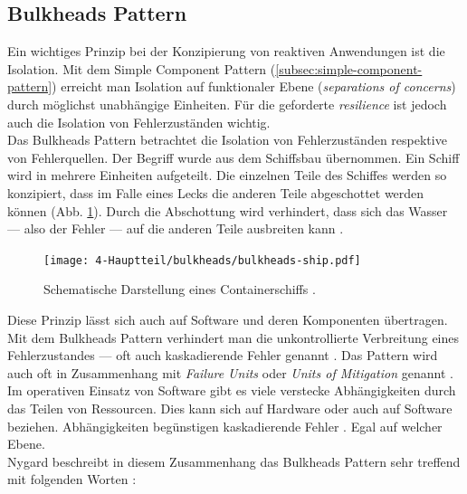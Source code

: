 \subsection{Bulkheads Pattern}
Ein wichtiges Prinzip bei der Konzipierung von reaktiven Anwendungen ist die Isolation. Mit dem Simple Component Pattern (\ref{subsec:simple-component-pattern}) erreicht man Isolation auf funktionaler Ebene (\textit{separations of concerns}) durch möglichst unabhängige Einheiten. Für die geforderte \textit{resilience} ist jedoch auch die Isolation von Fehlerzuständen wichtig.\\
Das Bulkheads Pattern betrachtet die Isolation von Fehlerzuständen respektive von Fehlerquellen. Der Begriff wurde aus dem Schiffsbau übernommen. Ein Schiff wird in mehrere Einheiten aufgeteilt. Die einzelnen Teile des Schiffes werden so konzipiert, dass im Falle eines Lecks die anderen Teile abgeschottet werden können (Abb. \ref{fig:bulkheads-ship}). Durch die Abschottung wird verhindert, dass sich das Wasser --- also der Fehler --- auf die anderen Teile ausbreiten kann \cite[S.~95]{nygard_release_2007} \cite[S.~214]{newman_building_2015} \cite[S.~35]{kuhn_reactive_2015}.\\

\begin{figure}[H]
 \centering
 \texttt{[image: 4-Hauptteil/bulkheads/bulkheads-ship.pdf]}
 \caption{Schematische Darstellung eines Containerschiffs \cite[S.~35]{kuhn_reactive_2015}.}
 \label{fig:bulkheads-ship}
\end{figure}

Diese Prinzip lässt sich auch auf Software und deren Komponenten übertragen. Mit dem Bulkheads Pattern verhindert man die unkontrollierte Verbreitung eines Fehlerzustandes --- oft auch kaskadierende Fehler genannt \cite{friedrichsen_unkaputtbar_2014}. Das Pattern wird auch oft in Zusammenhang mit \textit{Failure Units} oder \textit{Units of Mitigation} genannt \cite{friedrichsen_unkaputtbar_2014}.\\
Im operativen Einsatz von Software gibt es viele verstecke Abhängigkeiten durch das Teilen von Ressourcen. Dies kann sich auf Hardware oder auch auf Software beziehen. Abhängigkeiten begünstigen kaskadierende Fehler \cite[S.~96]{nygard_release_2007} \cite{friedrichsen_unkaputtbar_2014}. Egal auf welcher Ebene.\\

Nygard beschreibt in diesem Zusammenhang das Bulkheads Pattern sehr treffend mit folgenden Worten \cite[S.~96]{nygard_release_2007}:

